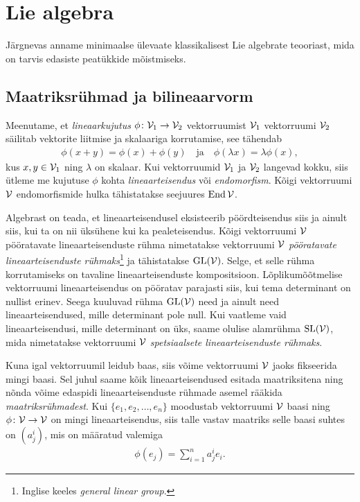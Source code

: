 

\section{Lie algebra}

Järgnevas anname minimaalse ülevaate klassikalisest Lie algebrate
teooriast, mida on tarvis edasiste peatükkide mõistmiseks.

\subsection{Maatriksrühmad ja bilineaarvorm}\label{subsec:mat-ryhmad}

Meenutame, et \emph{lineaarkujutus}
$\phi \colon \mathcal{V}_1 \to \mathcal{V}_2$ vektorruumist $\mathcal{V}_1$ vektorruumi $\mathcal{V}_2$ säilitab
vektorite liitmise ja skalaariga korrutamise, see tähendab
\begin{align*}
    \phi(x + y) = \phi(x) + \phi(y)
    \quad \text{ja} \quad
    \phi(\lambda x) = \lambda \phi(x),
\end{align*}
kus $x, y \in \mathcal{V}_1$ ning $\lambda$ on skalaar. Kui vektorruumid $\mathcal{V}_1$ ja
$\mathcal{V}_2$ langevad kokku, siis ütleme me kujutuse $\phi$ kohta
\emph{lineaarteisendus} või \emph{endomorfism}. Kõigi vektorruumi $\mathcal{V}$
endomorfismide hulka tähistatakse seejuures $\operatorname{End} \mathcal{V}$.

Algebrast on teada, et lineaarteisendusel eksisteerib pöördteisendus siis ja
ainult siis, kui ta on nii üksühene kui ka pealeteisendus. Kõigi vektorruumi
$\mathcal{V}$ pööratavate lineaarteisenduste rühma nimetatakse vektorruumi $\mathcal{V}$
\emph{pööratavate lineaarteisenduste rühmaks}\footnote{Inglise keeles
\emph{general linear group}.} ja tähistatakse $\operatorname{GL}(\mathcal{V})$. Selge, et selle
rühma korrutamiseks on tavaline lineaarteisenduste kompositsioon.
Lõplikumõõtmelise vektorruumi lineaarteisendus on pööratav parajasti siis,
kui tema determinant on nullist erinev. Seega kuuluvad rühma $\operatorname{GL}(\mathcal{V})$
need ja ainult need lineaarteisendused, mille determinant pole null.
Kui vaatleme vaid lineaarteisendusi, mille determinant on üks, saame olulise
alamrühma $\operatorname{SL}(\mathcal{V})$, mida nimetatakse vektorruumi $\mathcal{V}$
\emph{spetsiaalsete lineaarteisenduste rühmaks}.

Kuna igal vektorruumil leidub baas, siis võime vektorruumi $\mathcal{V}$ jaoks
fikseerida mingi baasi. Sel juhul
saame kõik lineaarteisendused esitada maatriksitena ning nõnda võime
edaspidi lineaarteisenduste rühmade asemel rääkida \emph{maatriksrühmadest}.
Kui $\{e_1, e_2, \dots, e_n\}$ moodustab vektorruumi $\mathcal{V}$ baasi ning
$\phi \colon \mathcal{V} \to \mathcal{V}$ on mingi lineaarteisendus, siis talle vastav maatriks
selle baasi suhtes on $(a^i_j)$, mis on määratud valemiga
\begin{align*}
    \phi(e_j) = \sum_{i=1}^{n} a^i_j e_i.
\end{align*}


